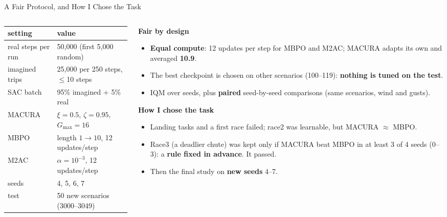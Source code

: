 \documentclass[aspectratio=169,10pt]{beamer}
\begin{document}
\begin{frame}{A Fair Protocol, and How I Chose the Task}
  \small
  \begin{columns}[T]
    \begin{column}{0.5\textwidth}
      \centering\footnotesize
      \begin{tabular}{ll}
        \toprule
        \textbf{setting} & \textbf{value} \\
        \midrule
        real steps per run & 50,000 (first 5,000 random) \\
        imagined trips & 25,000 per 250 steps, $\le$10 steps \\
        SAC batch & 95\% imagined + 5\% real \\
        MACURA & $\xi=0.5$, $\zeta=0.95$, $G_{\max}=16$ \\
        MBPO & length $1\to10$, 12 updates/step \\
        M2AC & $\alpha=10^{-3}$, 12 updates/step \\
        seeds & 4, 5, 6, 7 \\
        test & 50 new scenarios (3000--3049) \\
        \bottomrule
      \end{tabular}
    \end{column}
    \begin{column}{0.48\textwidth}
      \textbf{Fair by design}
      \begin{itemize}\footnotesize
        \item \textbf{Equal compute}: 12 updates per step for MBPO and M2AC; MACURA adapts its own and averaged
              \textbf{10.9}.
        \item The best checkpoint is chosen on other scenarios (100--119): \textbf{nothing is tuned on the test}.
        \item IQM over seeds, plus \textbf{paired} seed-by-seed comparisons (same scenarios, wind and gusts).
      \end{itemize}
      \textbf{How I chose the task}
      \begin{itemize}\footnotesize
        \item Landing tasks and a first race failed; race2 was learnable, but MACURA $\approx$ MBPO.
        \item Race3 (a deadlier chute) was kept only if MACURA beat MBPO in at least 3 of 4 seeds (0--3): a
              \textbf{rule fixed in advance}. It passed.
        \item Then the final study on \textbf{new seeds} 4--7.
      \end{itemize}
    \end{column}
  \end{columns}
\end{frame}
\end{document}
